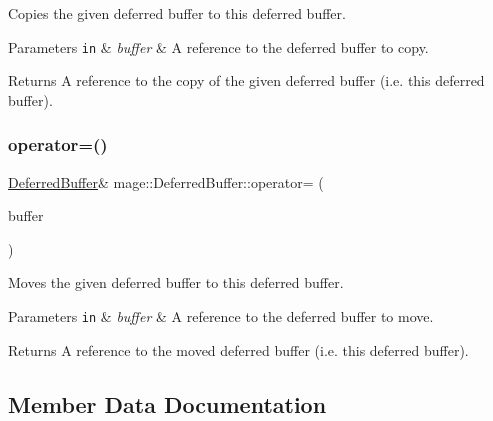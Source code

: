 Copies the given deferred buffer to this deferred buffer.


\begin{DoxyParams}[1]{Parameters}
\mbox{\tt in}  & {\em buffer} & A reference to the deferred buffer to copy. \\
\hline
\end{DoxyParams}
\begin{DoxyReturn}{Returns}
A reference to the copy of the given deferred buffer (i.\+e. this deferred buffer). 
\end{DoxyReturn}
\hypertarget{structmage_1_1_deferred_buffer_aaeebd1fa5bf16034b26c0416930859a3}{}\label{structmage_1_1_deferred_buffer_aaeebd1fa5bf16034b26c0416930859a3} 
\subsubsection{\texorpdfstring{operator=()}{operator=()}\hspace{0.1cm}{\footnotesize\ttfamily [2/2]}}
{\footnotesize\ttfamily \hyperlink{structmage_1_1_deferred_buffer}{Deferred\+Buffer}\& mage\+::\+Deferred\+Buffer\+::operator= (\begin{DoxyParamCaption}\item[{\hyperlink{structmage_1_1_deferred_buffer}{Deferred\+Buffer} \&\&}]{buffer }\end{DoxyParamCaption})\hspace{0.3cm}{\ttfamily [default]}}

Moves the given deferred buffer to this deferred buffer.


\begin{DoxyParams}[1]{Parameters}
\mbox{\tt in}  & {\em buffer} & A reference to the deferred buffer to move. \\
\hline
\end{DoxyParams}
\begin{DoxyReturn}{Returns}
A reference to the moved deferred buffer (i.\+e. this deferred buffer). 
\end{DoxyReturn}


\subsection{Member Data Documentation}
\hypertarget{structmage_1_1_deferred_buffer_a97df9b9ee6c5e37dc30f4c5eb7cf95c2}{}\label{structmage_1_1_deferred_buffer_a97df9b9ee6c5e37dc30f4c5eb7cf95c2} 
